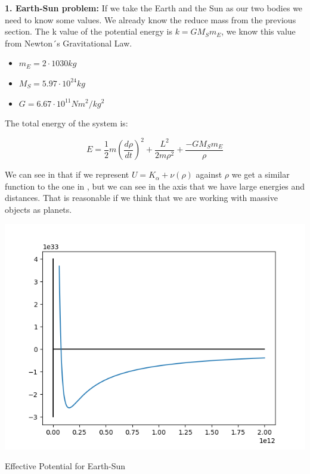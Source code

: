 \textbf{1. Earth-Sun problem:} If we take the Earth and the Sun as our two bodies we need to know some values. We already know the reduce mass from the previous section. The k value of the potential energy is $ k = GM_Sm_E$, we know this value from Newton´s Gravitational Law.

\begin{itemize}
    \item $m_E = 2 \cdot 10{30} kg$
    \item $M_S = 5.97\cdot 10^{24} kg$
    \item $G = 6.67 \cdot 10^{11} Nm^2/kg^2$
\end{itemize}

The total energy of the system is:

\begin{equation}
\label{energy_E-S}
    E = \frac{1}{2}m\left(\frac{d\rho}{dt}\right)^2+\frac{L^2}{2m\rho^2}+ \frac{ - G M_S m_E}{\rho}
\end{equation}

We can see in  that if we represent $U = K_{\alpha}+\nu(\rho)$ against $\rho$ we get a similar function to the one in , but we can see in the axis that we have large energies and distances. That is reasonable if we think that we are working with massive objects as planets.

\begin{marginfigure}
    \includegraphics{images/E-S_Potential_Well.png}
    \caption[Effective Potential for Earth-Sun]{Effective Potential for Earth-Sun}
\end{marginfigure}

